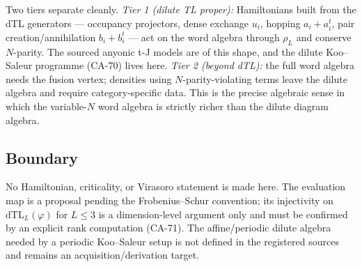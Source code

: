 Two tiers separate cleanly.  \emph{Tier 1 (dilute TL proper):} Hamiltonians
built from the dTL generators --- occupancy projectors, dense exchange
\(u_i\), hopping \(a_i+a_i^t\), pair creation/annihilation \(b_i+b_i^t\) ---
act on the word algebra through \(\rho_L\) and conserve \(N\)-parity.  The
sourced anyonic t-J models are of this shape, and the dilute Koo--Saleur
programme (CA-70) lives here.  \emph{Tier 2 (beyond dTL):} the full word
algebra needs the fusion vertex; densities using \(N\)-parity-violating terms
leave the dilute algebra and require category-specific data.  This is the
precise algebraic sense in which the variable-\(N\) word algebra is strictly
richer than the dilute diagram algebra.

\subsection{Boundary}

No Hamiltonian, criticality, or Virasoro statement is made here.  The
evaluation map is a proposal pending the Frobenius--Schur convention; its
injectivity on \(\mathrm{dTL}_L(\varphi)\) for \(L\le3\) is a dimension-level
argument only and must be confirmed by an explicit rank computation (CA-71).
The affine/periodic dilute algebra needed by a periodic Koo--Saleur setup is
not defined in the registered sources and remains an acquisition/derivation
target.
